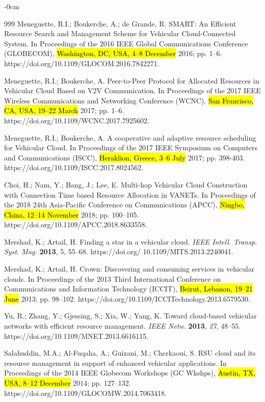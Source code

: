 \documentclass[electronics,aricle,accept,pdftex,moreauthors]{Definitions/mdpi}
\begin{document}
\begin{adjustwidth}{-\extralength}{0cm}
\begin{thebibliography}{999}
Meneguette, R.I.; Boukerche, A.; de Grande, R.  SMART: An Efficient Resource Search and Management Scheme for Vehicular Cloud-Connected System. In Proceedings of the {2016 IEEE Global Communications Conference (GLOBECOM)}, \hl{Washington, DC, USA, 4--8 December} 2016; pp. 1--6. https://doi.org/10.1109/GLOCOM.2016.7842271.

Meneguette, R.I.; Boukerche, A.  Peer-to-Peer Protocol for Allocated Resources in Vehicular Cloud Based on V2V Communication. In Proceedings of the {2017 IEEE Wireless Communications and Networking Conference (WCNC)}, \hl{San Francisco, CA, USA, 19--22 March} 2017; pp. 1--6. https://doi.org/10.1109/WCNC.2017.7925602.

Meneguette, R.I.; Boukerche, A. A cooperative and adaptive resource scheduling for Vehicular Cloud. In Proceedings of the {2017 IEEE Symposium on Computers and Communications (ISCC)}, \hl{Heraklion, Greece, 3--6 July} 2017; pp. 398-403. https://doi.org/10.1109/ISCC.2017.8024562.


Choi, H.; Nam, Y.; Bang, J.; Lee, E.  Multi-hop Vehicular Cloud Construction with Connection Time based Resource Allocation in VANETs. In Proceedings of the {2018 24th Asia-Pacific Conference on Communications (APCC)}, \hl{Ningbo, China, 12--14 November} 2018; pp. 100--105. https://doi.org/10.1109/APCC.2018.8633558.


Mershad, K.; Artail, H.  Finding a star in a vehicular cloud. \textit{IEEE Intell. Transp. Syst. Mag.} \textbf{2013},  5, 55--68. https://doi.org/ 10.1109/MITS.2013.2240041.

Mershad, K.; Artail, H.  Crown: Discovering and consuming services in vehicular clouds. In Proceedings of the {2013 Third International Conference on Communications and Information Technology (ICCIT)}, \hl{Beirut, Lebanon, 19--21 June} 2013; pp. 98--102. https://doi.org/10.1109/ICCITechnology.2013.6579530.

Yu, R.; Zhang, Y.; Gjessing, S.; Xia, W.; Yang, K.  Toward cloud-based vehicular networks with efficient resource management. \textit{IEEE Netw.} \textbf{2013}, \emph{27}, 48--55. https://doi.org/10.1109/MNET.2013.6616115.



Salahuddin, M.A.; Al-Fuqaha, A.; Guizani, M.; Cherkaoui, S.  RSU cloud and its resource management in support of enhanced vehicular applications. In Proceedings of the {2014 IEEE Globecom Workshops (GC Wkshps)}, \hl{Austin, TX, USA, 8--12 December} 2014; pp. 127--132. https://doi.org/10.1109/GLOCOMW.2014.7063418.


\end{thebibliography}
\end{adjustwidth}
\end{document}

